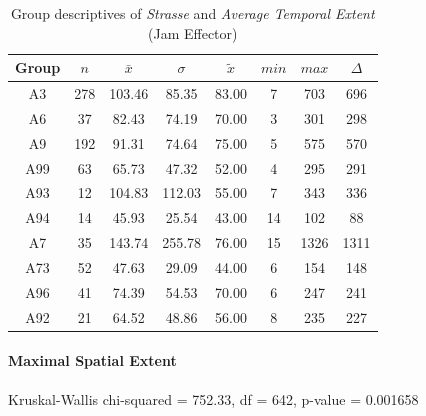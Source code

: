 \begin{table}[ht]
	\tiny
	\centering
	\begin{tabular}{c|c|c|c|c|c|c|c}
		\toprule
		Group & $n$ & $\bar{x}$ & $\sigma$ & $\tilde{x}$ & $min$ & $max$ & $\Delta$ \\
		\midrule
		A3   & 278 & 103.46 & 85.35  & 83.00 & 7  & 703  & 696 \\ 
		A6   & 37  & 82.43  & 74.19  & 70.00 & 3  & 301  & 298 \\ 
		A9   & 192 & 91.31  & 74.64  & 75.00 & 5  & 575  & 570 \\ 
		A99  & 63  & 65.73  & 47.32  & 52.00 & 4  & 295  & 291 \\ 
		A93  & 12  & 104.83 & 112.03 & 55.00 & 7  & 343  & 336 \\ 
		A94  & 14  & 45.93  & 25.54  & 43.00 & 14 & 102  & 88 \\ 
		A7   & 35  & 143.74 & 255.78 & 76.00 & 15 & 1326 & 1311 \\ 
		A73  & 52  & 47.63  & 29.09  & 44.00 & 6  & 154  & 148 \\ 
		A96  & 41  & 74.39  & 54.53  & 70.00 & 6  & 247  & 241 \\ 
		A92  & 21  & 64.52  & 48.86  & 56.00 & 8  & 235  & 227 \\ 
		\bottomrule
	  \end{tabular}
    \caption{Group descriptives of \textit{Strasse} and \textit{Average Temporal Extent} (Jam Effector)}
    \label{tbl:descriptives_baysis_effector_Strasse_TAvg}
\end{table}

\paragraph{Maximal Spatial Extent}
Kruskal-Wallis chi-squared = 752.33, df = 642, p-value = 0.001658

